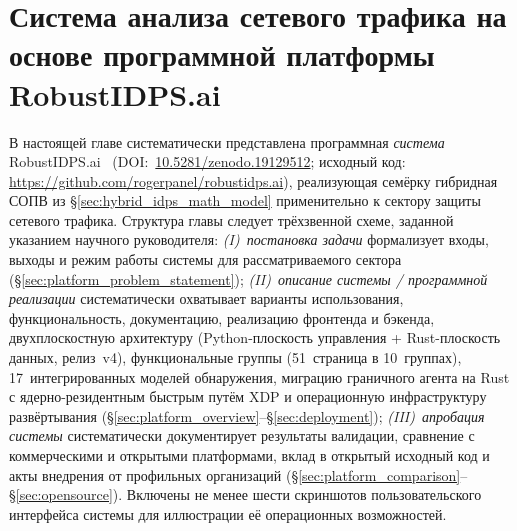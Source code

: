 
\chapter{Система анализа сетевого трафика на основе программной платформы RobustIDPS.ai}
\label{ch:platform}

В настоящей главе систематически представлена программная
\emph{система} \textsf{RobustIDPS.ai}~\cite{Anaedevha2026robustidps}
(DOI:~\url{10.5281/zenodo.19129512}; исходный код:
\url{https://github.com/rogerpanel/robustidps.ai}), реализующая
семёрку гибридная СОПВ из \S\ref{sec:hybrid_idps_math_model}
применительно к сектору защиты сетевого трафика. Структура главы
следует трёхзвенной схеме, заданной указанием научного руководителя:
\emph{(I)~постановка задачи} формализует входы, выходы и режим
работы системы для рассматриваемого сектора
(\S\ref{sec:platform_problem_statement}); \emph{(II)~описание
системы / программной реализации} систематически охватывает
варианты использования, функциональность, документацию, реализацию
фронтенда и бэкенда, двухплоскостную архитектуру (Python-плоскость
управления + Rust-плоскость данных, релиз~v4), функциональные
группы (51~страница в 10~группах), 17~интегрированных моделей
обнаружения, миграцию граничного агента на Rust с ядерно-резидентным
быстрым путём XDP и операционную инфраструктуру развёртывания
(\S\ref{sec:platform_overview}--\S\ref{sec:deployment});
\emph{(III)~апробация системы} систематически документирует
результаты валидации, сравнение с коммерческими и открытыми
платформами, вклад в открытый исходный код и акты внедрения от
профильных организаций
(\S\ref{sec:platform_comparison}--\S\ref{sec:opensource}).
Включены не менее шести скриншотов пользовательского интерфейса
системы для иллюстрации её операционных возможностей.


